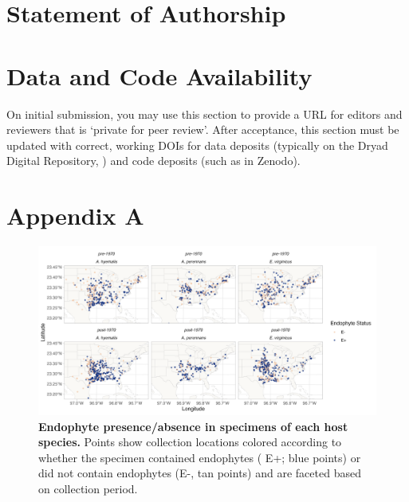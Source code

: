 \documentclass[11pt]{article}
\begin{document}
	
	\section*{Statement of Authorship}
	

	
	\section*{Data and Code Availability}
	
	On initial submission, you may use this section to provide a URL for editors and reviewers that is `private for peer review'. After acceptance, this section must be updated with correct, working DOIs for data deposits (typically on the Dryad Digital Repository, ) and code deposits (such as in Zenodo). 
	
	\section*{Appendix A}
	\renewcommand{\thefigure}{A\arabic{figure}}
	\setcounter{figure}{0}
	
		\renewcommand{\thetable}{A\arabic{table}}
	\setcounter{equation}{0}  %
	\setcounter{figure}{0}
	\setcounter{table}{0}
	
	\begin{figure}[H]
		\centering
		\includegraphics[width = \linewidth]{endo_status_map.png}
		\caption{\textbf{Endophyte presence/absence in specimens of each host species.} Points show collection locations colored according to whether the specimen contained endophytes ( E+; blue points) or did not contain endophytes (E-, tan points) and are faceted based on collection period.}
	\end{figure}
	
\end{document}
